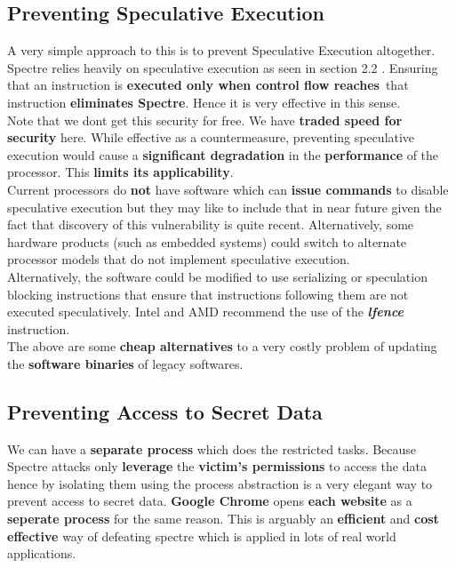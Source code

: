 \documentclass[12pt]{article}
\begin{document}
\subsection{Preventing Speculative Execution}
A very simple approach to this is to prevent Speculative Execution altogether. Spectre relies heavily on speculative execution as seen in section 2.2 . Ensuring that an instruction is \textbf{executed only when control flow reaches}\ that instruction \textbf{eliminates Spectre}. Hence it is very effective in this sense.\\

 Note that we dont get this security for free. We have \textbf{traded speed for security} here. While effective as a countermeasure, preventing speculative execution would cause a \textbf{significant degradation} in the \textbf{performance} of the processor. This \textbf{limits its applicability}. \\

Current processors do \textbf{not} have software which can \textbf{issue commands} to disable speculative execution but they may like to include that in near future given the fact that discovery of this vulnerability is quite recent. Alternatively, some hardware products (such as embedded systems) could switch to alternate processor models that do not implement speculative execution. \\

Alternatively, the software could be modified to use serializing or speculation blocking instructions that ensure that instructions following them are not executed speculatively. Intel and AMD recommend the use of the \textbf{\textit{lfence}} instruction.\\

The above are some \textbf{cheap alternatives} to a very costly problem of updating the \textbf{software binaries} of legacy softwares.
\subsection{Preventing Access to Secret Data}
We can have a \textbf{separate process} which does the restricted tasks. Because Spectre attacks only \textbf{leverage} the \textbf{victim’s permissions} to access the data hence by isolating them using the process abstraction is a very elegant way to prevent access to secret data. \textbf{Google Chrome} opens \textbf{each website} as a \textbf{seperate process} for the same reason. This is arguably an \textbf{efficient} and \textbf{cost effective} way of defeating spectre which is applied in lots of real world applications.
\end{document}
